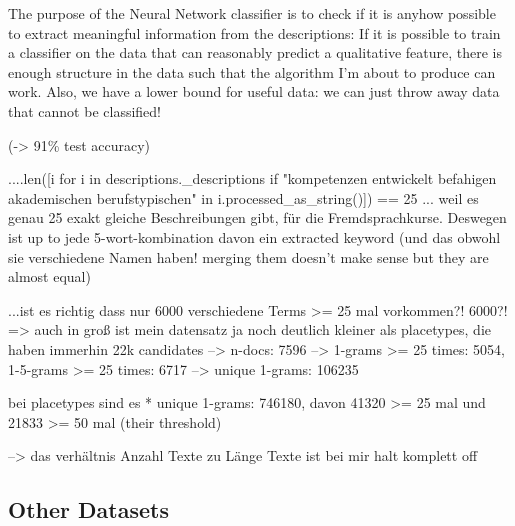 \documentclass[11pt,
  paper=a4, 
  hidelinks,
  bibliography=totocnumbered,
	captions=tableheading,
	BCOR=10mm
]{scrreprt}
\theoremstyle{definition}
\begin{document}
The purpose of the Neural Network classifier is to check if it is anyhow possible to extract meaningful information from the descriptions: If it is possible to train a classifier on the data that can reasonably predict a qualitative feature, there is enough structure in the data such that the algorithm I'm about to produce can work.
Also, we have a lower bound for useful data: we can just throw away data that cannot be classified!

(-> 91\% test accuracy)


....len([i for i in descriptions._descriptions if "kompetenzen entwickelt befahigen akademischen berufstypischen" in i.processed_as_string()]) == 25  ... weil es genau 25 exakt gleiche Beschreibungen gibt, für die Fremdsprachkurse. Deswegen ist up to jede 5-wort-kombination davon ein extracted keyword
(und das obwohl sie verschiedene Namen haben! merging them doesn't make sense but they are almost equal)


...ist es richtig dass nur 6000 verschiedene Terms >= 25 mal vorkommen?! 6000?!
=> auch in groß ist mein datensatz ja noch deutlich kleiner als placetypes, die haben immerhin 22k candidates
--> n-docs: 7596
--> 1-grams >= 25 times: 5054, 1-5-grams >= 25 times: 6717
--> unique 1-grams: 106235

bei placetypes sind es 
* unique 1-grams: 746180, davon 41320 >= 25 mal und 21833 >= 50 mal (their threshold)

--> das verhältnis Anzahl Texte zu Länge Texte ist bei mir halt komplett off 



\subsection{Other Datasets}

\end{document}
